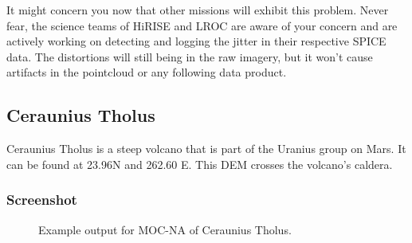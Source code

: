 It might concern you now that other missions will exhibit this
problem. Never fear, the science teams of HiRISE and LROC are aware of
your concern and are actively working on detecting and logging the
jitter in their respective SPICE data. The distortions will still
being in the raw imagery, but it won't cause artifacts in the
pointcloud or any following data product.

\subsection{Ceraunius Tholus}

Ceraunius Tholus is a steep volcano that is part of the Uranius group
on Mars. It can be found at 23.96N and 262.60 E. This DEM crosses the
volcano's caldera.

\subsubsection*{Screenshot}

\begin{figure}[h!]
\centering
  \hfil
\caption{Example output for MOC-NA of Ceraunius Tholus.}
\label{fig:mocna_ceraunius_example}
\end{figure}

